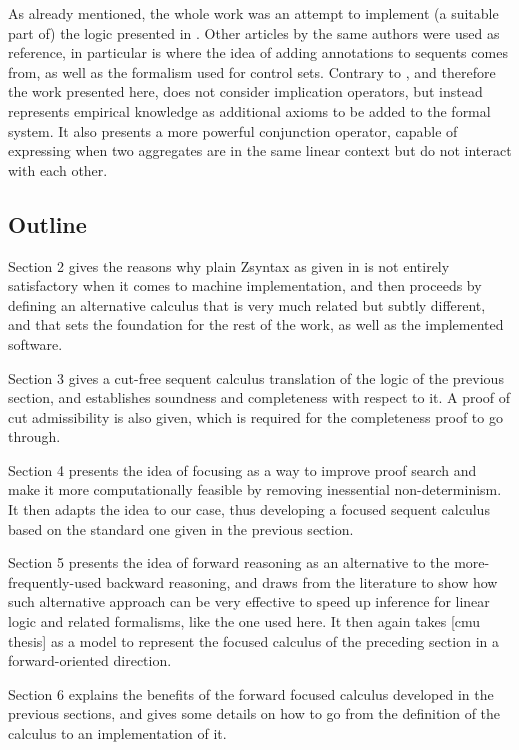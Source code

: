 As already mentioned, the whole work was an attempt to implement (a suitable
part of) the logic presented in \cite{adding-logic}.
Other articles by the same authors were used as reference, in particular
\cite{non-mono} is where the idea of adding annotations to sequents comes from,
as well as the formalism used for control sets.
Contrary to \cite{adding-logic}, and therefore the work presented here,
\cite{non-mono} does not consider implication operators, but instead represents
empirical knowledge as additional axioms to be added to the formal system.
It also presents a more powerful conjunction operator, capable of expressing
when two aggregates are in the same linear context but do not interact with each
other.

\subsection{Outline}

Section 2 gives the reasons why plain Zsyntax as given in \cite{adding-logic} is
not entirely satisfactory when it comes to machine implementation, and then
proceeds by defining an alternative calculus that is very much related but
subtly different, and that sets the foundation for the rest of the work, as well
as the implemented software.

Section 3 gives a cut-free sequent calculus translation of the logic of the
previous section, and establishes soundness and completeness with respect to
it. A proof of cut admissibility is also given, which is required for the
completeness proof to go through.

Section 4 presents the idea of focusing as a way to improve proof search and
make it more computationally feasible by removing inessential
non-determinism. It then adapts the idea to our case, thus developing a focused
sequent calculus based on the standard one given in the previous section.

Section 5 presents the idea of forward reasoning as an alternative to the
more-frequently-used backward reasoning, and draws from the literature to show
how such alternative approach can be very effective to speed up inference for
linear logic and related formalisms, like the one used here.  It then again
takes [cmu thesis] as a model to represent the focused calculus of the preceding
section in a forward-oriented direction.

Section 6 explains the benefits of the forward focused calculus developed in the
previous sections, and gives some details on how to go from the definition of
the calculus to an implementation of it.

